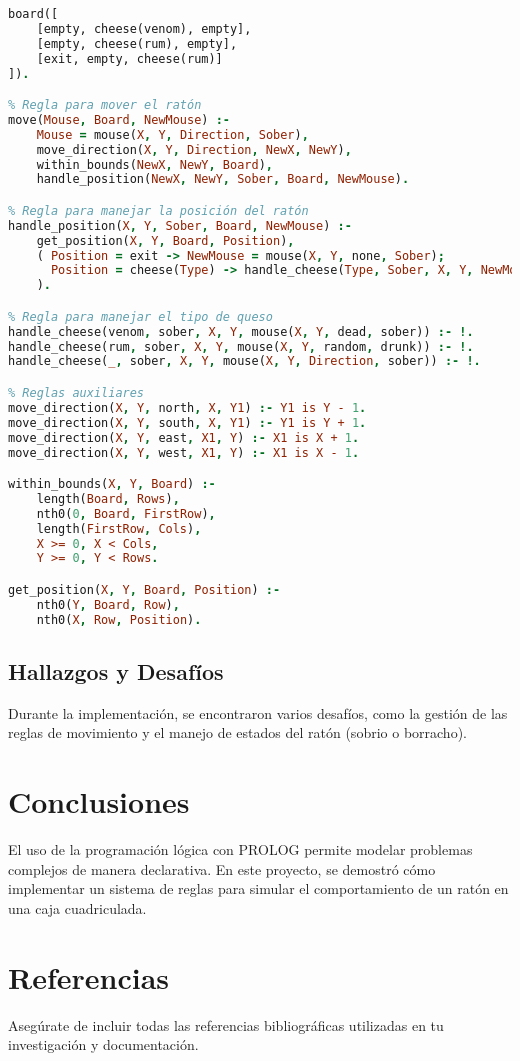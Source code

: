 \documentclass[a4paper,12pt]{article}
\begin{document}
\begin{lstlisting}[language=Prolog,caption=Implementación en PROLOG]
% Definición de un tablero (ejemplo)
board([
    [empty, cheese(venom), empty],
    [empty, cheese(rum), empty],
    [exit, empty, cheese(rum)]
]).

% Regla para mover el ratón
move(Mouse, Board, NewMouse) :-
    Mouse = mouse(X, Y, Direction, Sober),
    move_direction(X, Y, Direction, NewX, NewY),
    within_bounds(NewX, NewY, Board),
    handle_position(NewX, NewY, Sober, Board, NewMouse).

% Regla para manejar la posición del ratón
handle_position(X, Y, Sober, Board, NewMouse) :-
    get_position(X, Y, Board, Position),
    ( Position = exit -> NewMouse = mouse(X, Y, none, Sober);
      Position = cheese(Type) -> handle_cheese(Type, Sober, X, Y, NewMouse)
    ).

% Regla para manejar el tipo de queso
handle_cheese(venom, sober, X, Y, mouse(X, Y, dead, sober)) :- !.
handle_cheese(rum, sober, X, Y, mouse(X, Y, random, drunk)) :- !.
handle_cheese(_, sober, X, Y, mouse(X, Y, Direction, sober)) :- !.

% Reglas auxiliares
move_direction(X, Y, north, X, Y1) :- Y1 is Y - 1.
move_direction(X, Y, south, X, Y1) :- Y1 is Y + 1.
move_direction(X, Y, east, X1, Y) :- X1 is X + 1.
move_direction(X, Y, west, X1, Y) :- X1 is X - 1.

within_bounds(X, Y, Board) :-
    length(Board, Rows),
    nth0(0, Board, FirstRow),
    length(FirstRow, Cols),
    X >= 0, X < Cols,
    Y >= 0, Y < Rows.

get_position(X, Y, Board, Position) :-
    nth0(Y, Board, Row),
    nth0(X, Row, Position).
\end{lstlisting}

\subsection{Hallazgos y Desafíos}
Durante la implementación, se encontraron varios desafíos, como la gestión de las reglas de movimiento y el manejo de estados del ratón (sobrio o borracho).

\section{Conclusiones}
\label{sec:conclusiones}
El uso de la programación lógica con PROLOG permite modelar problemas complejos de manera declarativa. En este proyecto, se demostró cómo implementar un sistema de reglas para simular el comportamiento de un ratón en una caja cuadriculada.

\section{Referencias}
\label{sec:referencias}
Asegúrate de incluir todas las referencias bibliográficas utilizadas en tu investigación y documentación.
\end{document}
